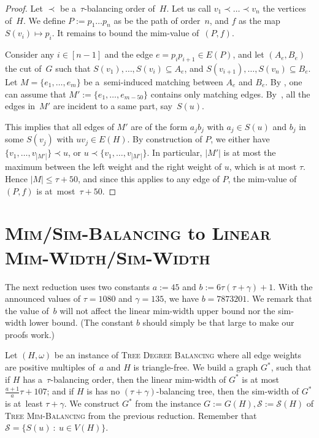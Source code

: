 \documentclass[a4paper,UKenglish,cleveref,hyperref,autoref]{lipics-v2021}
\newcommand{\weight}{\omega}
\newcommand{\tdb}{\textsc{Tree Degree Balancing}\xspace}
\newcommand{\tmb}{\textsc{Tree Mim-Balancing}\xspace}
\begin{document}
\begin{proof}
Let $\prec$ be a~$\tau$-balancing order of~$H$.
Let us call $v_1 \prec \dots \prec v_n$ the vertices of~$H$.
We define $P := p_1 \ldots p_n$ as be the path of order~$n$, and $f$ as the map $S(v_i) \mapsto p_i$.
It remains to bound the mim-value of~$(P, f)$.

Consider any $i \in [n-1]$ and the edge $e = p_ip_{i+1} \in E(P)$,
and let $(A_e, B_e)$ the cut of~$G$ such that $S(v_1), \dots, S(v_i) \subseteq A_e$, and $S(v_{i+1}), \dots, S(v_n) \subseteq B_e$.
Let $M = \{e_1, \ldots, e_m\}$ be a~semi-induced matching between $A_e$ and $B_e$. By , one can assume that $M' := \{e_1, \dots, e_{m - 50}\}$ contains only matching edges.
By~, all the edges in~$M'$ are incident to a same part, say~$S(u)$.

This implies that all edges of $M'$ are of the form $a_jb_j$ with $a_j \in S(u)$ and $b_j$ in some $S(v_j)$ with $uv_j \in E(H)$.
By construction of $P$, we either have $\{v_1, \dots, v_{|M'|}\} \prec u$, or $u \prec \{v_1, \dots, v_{|M'|}\}$. 
In particular, $|M'|$ is at most the maximum between the left weight and the right weight of $u$, which is at most $\tau$.
Hence $|M| \leqslant \tau + 50$, and since this applies to any edge of $P$, the mim-value of~$(P, f)$ is at~most~$\tau + 50$. 
\end{proof}

\section{\textsc{Mim/Sim-Balancing} to \textsc{Linear Mim-Width/Sim-Width}}\label{sec:balancing-to-mim-width}

\newcommand{\gad}{\mathcal G}

The next reduction uses two constants $a := 45$ and $b:= 6 \tau (\tau + \gamma) + 1$.
With the announced values of $\tau = 1080$ and $\gamma = 135$, we have $b = 7873201$.
We remark that the value of~$b$ will not affect the linear mim-width upper bound nor the sim-width lower bound.
(The constant $b$ should simply be that large to make our proofs work.)

Let $(H, \weight)$ be an instance of \tdb where all edge weights are positive multiples of~$a$ and $H$ is triangle-free.
We build a graph $G^*$, such that if $H$ has a~$\tau$-balancing order, then the linear mim-width of $G^*$ is at most $\frac{a+1}{a} \tau + 107$; and if $H$ is has no $(\tau+\gamma)$-balancing tree, then the sim-width of $G^*$ is at~least $\tau+\gamma$.
We construct $G^*$ from the instance $G := G(H), \mathcal S := \mathcal{S}(H)$ of \tmb from the previous reduction.
Remember that $\mathcal S = \{S(u)~:~u \in V(H)\}$.
\end{document}
